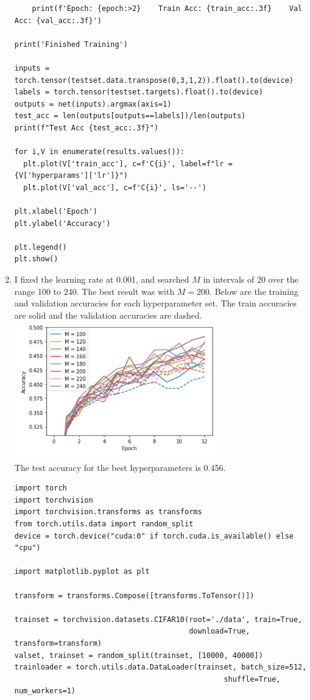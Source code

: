 \documentclass{article}
\begin{document}
\begin{enumerate}
\begin{verbatim}
    print(f'Epoch: {epoch:>2}    Train Acc: {train_acc:.3f}    Val Acc: {val_acc:.3f}')

print('Finished Training')

inputs = torch.tensor(testset.data.transpose(0,3,1,2)).float().to(device)
labels = torch.tensor(testset.targets).float().to(device)
outputs = net(inputs).argmax(axis=1)
test_acc = len(outputs[outputs==labels])/len(outputs)
print(f"Test Acc {test_acc:.3f}")

for i,V in enumerate(results.values()):
  plt.plot(V['train_acc'], c=f'C{i}', label=f"lr = {V['hyperparams']['lr']}")
  plt.plot(V['val_acc'], c=f'C{i}', ls='--')

plt.xlabel('Epoch')
plt.ylabel('Accuracy')

plt.legend()
plt.show()
        \end{verbatim}

        \newpage
        \item I fixed the learning rate at 0.001, and searched $M$ in intervals of 20 over the range 100 to 240.
        The best result was with $M = 200$.
        Below are the training and validation accuracies for each hyperparameter set.
        The train accuracies are solid and the validation accuracies are dashed. \\
        \includegraphics[width=0.7\textwidth]{code/A4b.png} \\
        The test accuracy for the best hyperparameters is 0.456.
        \begin{verbatim}
import torch
import torchvision
import torchvision.transforms as transforms
from torch.utils.data import random_split
device = torch.device("cuda:0" if torch.cuda.is_available() else "cpu")

import matplotlib.pyplot as plt

transform = transforms.Compose([transforms.ToTensor()])

trainset = torchvision.datasets.CIFAR10(root='./data', train=True,
                                        download=True, transform=transform)
valset, trainset = random_split(trainset, [10000, 40000])
trainloader = torch.utils.data.DataLoader(trainset, batch_size=512,
                                                shuffle=True, num_workers=1)


\end{verbatim}
\end{enumerate}
\end{document}

